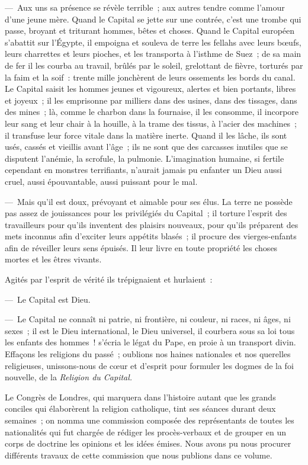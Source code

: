 \documentclass[french,twoside]{book} %
\newcommand\chapterclose{} %
\begin{document}
— Aux uns sa présence se révèle terrible ; aux autres tendre comme l’amour d’une jeune mère. Quand le Capital se jette sur une contrée, c’est une trombe qui passe, broyant et triturant hommes, bêtes et choses. Quand le Capital européen s’abattit sur l’Égypte, il empoigna et souleva de terre les fellahs avec leurs bœufs, leurs charrettes et leurs pioches, et les transporta à l’isthme de Suez ; de sa main de fer il les courba au travail, brûlés par le soleil, grelottant de fièvre, torturés par la faim et la soif : trente mille jonchèrent de leurs ossements les bords du canal. Le Capital saisit les hommes jeunes et vigoureux, alertes et bien portants, libres et joyeux ; il les emprisonne par milliers dans des usines, dans des tissages, dans des mines ; là, comme le charbon dans la fournaise, il les consomme, il incorpore leur sang et leur chair à la houille, à la trame des tissus, à l’acier des machines ; il transfuse leur force vitale dans la matière inerte. Quand il les lâche, ils sont usés, cassés et vieillis avant l’âge ; ils ne sont que des carcasses inutiles que se disputent l’anémie, la scrofule, la pulmonie. L'imagination humaine, si fertile cependant en monstres terrifiants, n’aurait jamais pu enfanter un Dieu aussi cruel, aussi épouvantable, aussi puissant pour le mal.\par
— Mais qu’il est doux, prévoyant et aimable pour ses élus. La terre ne possède pas assez de jouissances pour les privilégiés du Capital ; il torture l’esprit des travailleurs pour qu’ils inventent des plaisirs nouveaux, pour qu’ils préparent des mets inconnus afin d’exciter leurs appétits blasés ; il procure des vierges-enfants afin de réveiller leurs sens épuisés. Il leur livre en toute propriété les choses mortes et les êtres vivants.\par
Agités par l’esprit de vérité ils trépignaient et hurlaient :\par
— Le Capital est Dieu.\par
— Le Capital ne connaît ni patrie, ni frontière, ni couleur, ni races, ni âges, ni sexes ; il est le Dieu international, le Dieu universel, il courbera sous sa loi tous les enfants des hommes ! s’écria le légat du Pape, en proie à un transport divin. Effaçons les religions du passé ; oublions nos haines nationales et nos querelles religieuses, unissons-nous de cœur et d’esprit pour formuler les dogmes de la foi nouvelle, de la \emph{Religion du Capital.}\par
Le Congrès de Londres, qui marquera dans l’histoire autant que les grands conciles qui élaborèrent la religion catholique, tint ses séances durant deux semaines ; on nomma une commission composée des représentants de toutes les nationalités qui fut chargée de rédiger les procès-verbaux et de grouper en un corps de doctrine les opinions et les idées émises. Nous avons pu nous procurer différents travaux de cette commission que nous publions dans ce volume.
\chapterclose
\end{document}
